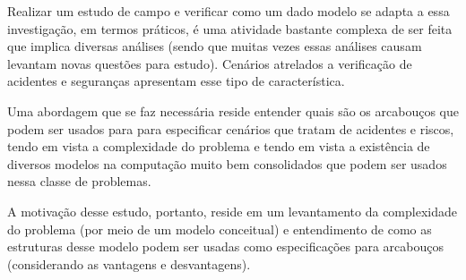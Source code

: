 Realizar um estudo de campo e verificar como um dado modelo se adapta a essa investigação, em termos práticos, é uma atividade bastante complexa de ser feita que implica diversas análises (sendo que muitas vezes essas análises causam levantam novas questões para estudo). Cenários atrelados a verificação de acidentes e seguranças apresentam esse tipo de característica. 

Uma abordagem que se faz necessária reside entender quais são os arcabouços que podem ser usados para para especificar cenários que tratam de acidentes e riscos, tendo em vista a complexidade do problema e tendo em vista a existência de diversos modelos na computação muito bem consolidados que podem ser usados nessa classe de problemas. 

A motivação desse estudo, portanto, reside em um levantamento da complexidade do problema (por meio de um modelo conceitual) e entendimento de como as estruturas desse modelo podem ser usadas como especificações para arcabouços (considerando as vantagens e desvantagens).